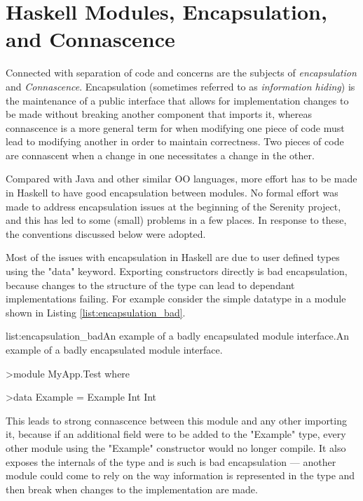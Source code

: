 \section{Haskell Modules, Encapsulation, and Connascence}
\label{sec:encapsulation}

Connected with separation of code and concerns are the subjects of \emph{encapsulation} and \emph{Connascence}. Encapsulation (sometimes referred to as \emph{information hiding}) is the maintenance of a public interface that allows for implementation changes to be made without breaking another component that imports it, whereas connascence is a more general term for when modifying one piece of code must lead to modifying another in order to maintain correctness. Two pieces of code are connascent when a change in one necessitates a change in the other.

Compared with Java and other similar OO languages, more effort has to be made in Haskell to have good encapsulation between modules. No formal effort was made to address encapsulation issues at the beginning of the Serenity project, and this has led to some (small) problems in a few places. In response to these, the conventions discussed below were adopted.

Most of the issues with encapsulation in Haskell are due to user defined types using the "data" keyword. Exporting constructors directly is bad encapsulation, because changes to the structure of the type can lead to dependant implementations failing. For example consider the simple datatype in a module shown in Listing \ref{list:encapsulation_bad}.

\vspace{-0.5em}
\begin{listing}{list:encapsulation_bad}{An example of a badly encapsulated module interface.}{An example of a badly encapsulated module interface.}{}
\end{listing}\vspace{-1.5em}

\begin{haskell}
>module MyApp.Test where

>data Example = Example Int Int

\end{haskell}
\noindent
This leads to strong connascence between this module and any other importing it, because if an additional field were to be added to the "Example" type, every other module using the "Example" constructor would no longer compile. It also exposes the internals of the type and is such is bad encapsulation --- another module could come to rely on the way information is represented in the type and then break when changes to the implementation are made.

